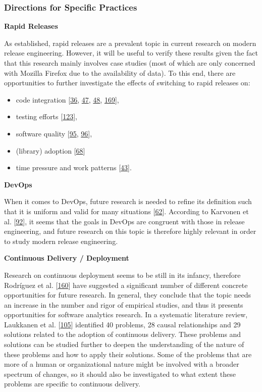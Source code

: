 \documentclass[]{book}
\providecommand{\tightlist}{%
  \setlength{\itemsep}{0pt}\setlength{\parskip}{0pt}}
\begin{document}
\subsubsection{Directions for Specific
Practices}\label{directions-for-specific-practices}

\textbf{Rapid Releases}

As established, rapid releases are a prevalent topic in current research
on modern release engineering. However, it will be useful to verify
these results given the fact that this research mainly involves case
studies (most of which are only concerned with Mozilla Firefox due to
the availability of data). To this end, there are opportunities to
further investigate the effects of switching to rapid releases on:

\begin{itemize}
\tightlist
\item
  code integration {[}\protect\hyperlink{ref-castelluccio2017a}{36},
  \protect\hyperlink{ref-da2014a}{47},
  \protect\hyperlink{ref-da2016a}{48},
  \protect\hyperlink{ref-souza2015a}{169}{]},
\item
  testing efforts {[}\protect\hyperlink{ref-mantyla2015a}{123}{]},
\item
  software quality {[}\protect\hyperlink{ref-khomh2015a}{95},
  \protect\hyperlink{ref-khomh2012a}{96}{]},
\item
  (library) adoption {[}\protect\hyperlink{ref-fujibayashi2017a}{68}{]}
\item
  time pressure and work patterns
  {[}\protect\hyperlink{ref-claes2017a}{43}{]}.
\end{itemize}

\textbf{DevOps}

When it comes to DevOps, future research is needed to refine its
definition such that it is uniform and valid for many situations
{[}\protect\hyperlink{ref-dyck2015a}{62}{]}. According to Karvonen et
al. {[}\protect\hyperlink{ref-karvonen2017a}{92}{]}, it seems that the
goals in DevOps are congruent with those in release engineering, and
future research on this topic is therefore highly relevant in order to
study modern release engineering.

\textbf{Continuous Delivery / Deployment}

Research on continuous deployment seems to be still in its infancy,
therefore Rodríguez et al.
{[}\protect\hyperlink{ref-rodriguez2017a}{160}{]} have suggested a
significant number of different concrete opportunities for future
research. In general, they conclude that the topic needs an increase in
the number and rigor of empirical studies, and thus it presents
opportunities for software analytics research. In a systematic
literature review, Laukkanen et al.
{[}\protect\hyperlink{ref-laukkanen2017a}{105}{]} identified 40
problems, 28 causal relationships and 29 solutions related to the
adoption of continuous delivery. These problems and solutions can be
studied further to deepen the understanding of the nature of these
problems and how to apply their solutions. Some of the problems that are
more of a human or organizational nature might be involved with a
broader spectrum of changes, so it should also be investigated to what
extent these problems are specific to continuous delivery.
\end{document}
